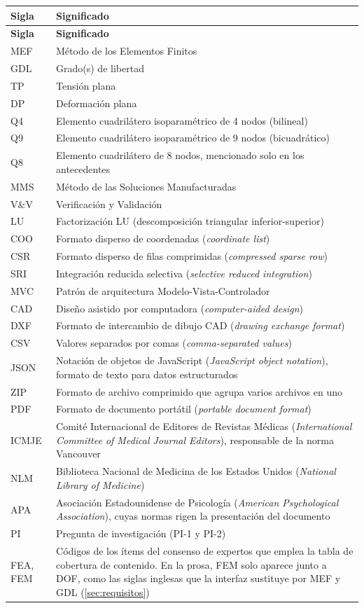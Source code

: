 \begin{longtable}{@{}p{2.4cm}p{11.4cm}@{}}
\toprule
\textbf{Sigla} & \textbf{Significado} \\
\midrule
\endfirsthead
\toprule
\textbf{Sigla} & \textbf{Significado} \\
\midrule
\endhead
\bottomrule
\endfoot
MEF & Método de los Elementos Finitos \\
GDL & Grado(s) de libertad \\
TP & Tensión plana \\
DP & Deformación plana \\
Q4 & Elemento cuadrilátero isoparamétrico de 4 nodos (bilineal) \\
Q9 & Elemento cuadrilátero isoparamétrico de 9 nodos (bicuadrático) \\
Q8 & Elemento cuadrilátero de 8 nodos, mencionado solo en los antecedentes \\
MMS & Método de las Soluciones Manufacturadas \\
V\&V & Verificación y Validación \\
LU & Factorización LU (descomposición triangular inferior-superior) \\
COO & Formato disperso de coordenadas (\emph{coordinate list}) \\
CSR & Formato disperso de filas comprimidas (\emph{compressed sparse row}) \\
SRI & Integración reducida selectiva (\emph{selective reduced integration}) \\
MVC & Patrón de arquitectura Modelo-Vista-Controlador \\
CAD & Diseño asistido por computadora (\emph{computer-aided design}) \\
DXF & Formato de intercambio de dibujo CAD (\emph{drawing exchange format}) \\
CSV & Valores separados por comas (\emph{comma-separated values}) \\
JSON & Notación de objetos de JavaScript (\emph{JavaScript object notation}), formato de texto para datos estructurados \\
ZIP & Formato de archivo comprimido que agrupa varios archivos en uno \\
PDF & Formato de documento portátil (\emph{portable document format}) \\
ICMJE & Comité Internacional de Editores de Revistas Médicas (\emph{International Committee of Medical Journal Editors}), responsable de la norma Vancouver \\
NLM & Biblioteca Nacional de Medicina de los Estados Unidos (\emph{National Library of Medicine}) \\
APA & Asociación Estadounidense de Psicología (\emph{American Psychological Association}), cuyas normas rigen la presentación del documento \\
PI & Pregunta de investigación (PI-1 y PI-2) \\
FEA, FEM & Códigos de los ítems del consenso de expertos que emplea la tabla de cobertura de contenido. En la prosa, FEM solo aparece junto a DOF, como las siglas inglesas que la interfaz sustituye por MEF y GDL (\autoref{sec:requisitos}) \\
\end{longtable}
